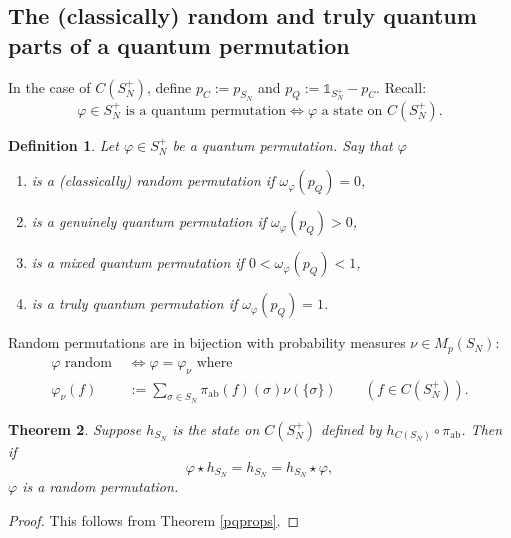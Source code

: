 \documentclass[12pt]{amsart}
\newtheorem{theorem}{Theorem}[section]
\newtheorem{definition}[theorem]{Definition}
\theoremstyle{remark}
\theoremstyle{remark}
\begin{document}
\subsection{The (classically) random and truly quantum parts of a quantum permutation}
In the case of $C(S_N^+)$, define $p_C:=p_{S_N}$ and $p_Q:=\mathds{1}_{S_N^+}-p_C$. Recall:
$$\varphi\in S_N^+ \text{ is a quantum permutation}\iff\varphi\text{ a state on }C(S_N^+).$$
\begin{definition}
Let $\varphi\in S_N^+$ be a quantum permutation. Say that $\varphi$
\begin{enumerate}
  \item[(i)] is a \emph{(classically) random permutation} if $\omega_\varphi(p_Q)=0$,
  \item[(ii)] is a \emph{genuinely quantum permutation} if $\omega_\varphi(p_Q)>0$,
  \item[(iii)] is a \emph{mixed quantum permutation} if  $0<\omega_\varphi(p_Q)<1$,
  \item[(iv)] is a \emph{truly quantum permutation} if $\omega_\varphi(p_Q)=1$.
\end{enumerate}
\end{definition}
Random permutations are in bijection with probability measures $\nu\in M_p(S_N)$:
\begin{align*}
\varphi\text{ random }&\iff \varphi=\varphi_\nu\text{ where }\\
\varphi_\nu(f)&:=\sum_{\sigma\in S_N}\pi_{\text{ab}}(f)(\sigma)\nu(\{\sigma\})\qquad (f\in C(S_N^+)).
\end{align*}

\begin{theorem}\label{absorb}
Suppose $h_{S_N}$ is the state on $C(S_N^+)$ defined by $h_{C(S_N)}\circ \pi_{\text{ab}}$. Then if
$$\varphi\star h_{S_N}=h_{S_N}=h_{S_N}\star \varphi,$$
$\varphi$ is a random permutation.
\end{theorem}
\begin{proof}
This follows from Theorem \ref{pqprops}.

\end{proof}
\end{document}
